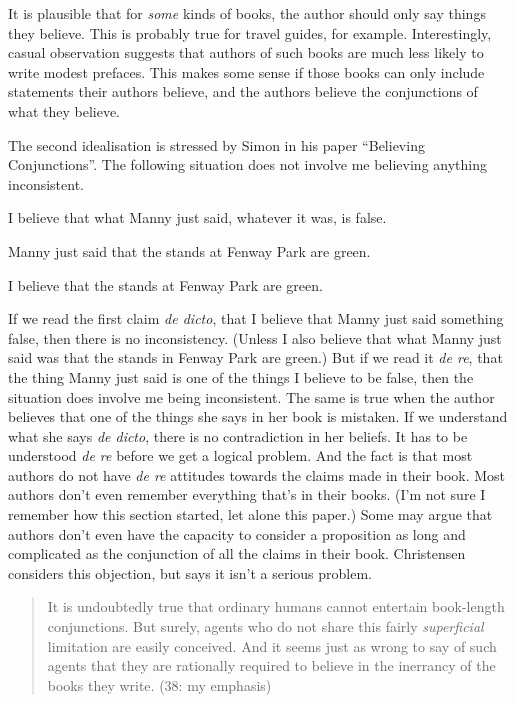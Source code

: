 It is plausible that for \textit{some} kinds of books, the author should only say things they believe. This is probably true for travel guides, for example. Interestingly, casual observation suggests that authors of such books are much less likely to write modest prefaces. This makes some sense if those books can only include statements their authors believe, and the authors believe the conjunctions of what they believe.

The second idealisation is stressed by Simon \citeauthor{Evnine1999} in his paper ``Believing Conjunctions''. The following situation does not involve me believing anything inconsistent. 

\begin{itemize*}
\item I believe that what Manny just said, whatever it was, is false. 
\item Manny just said that the stands at Fenway Park are green. 
\item I believe that the stands at Fenway Park are green. 
\end{itemize*}

\noindent If we read the first claim \textit{de dicto}, that I believe that Manny just said something false, then there is no inconsistency. (Unless I also believe that what Manny just said was that the stands in Fenway Park are green.) But if we read it \textit{de re}, that the thing Manny just said is one of the things I believe to be false, then the situation does involve me being inconsistent. The same is true when the author believes that one of the things she says in her book is mistaken. If we understand what she says \textit{de dicto}, there is no contradiction in her beliefs. It has to be understood \textit{de re} before we get a logical problem. And the fact is that most authors do not have \textit{de re} attitudes towards the claims made in their book. Most authors don't even remember everything that's in their books. (I'm not sure I remember how this section started, let alone this paper.) Some may argue that authors don't even have the capacity to consider a proposition as long and complicated as the conjunction of all the claims in their book. Christensen considers this objection, but says it isn't a serious problem.

\begin{quote}
It is undoubtedly true that ordinary humans cannot entertain book-length conjunctions. But surely, agents who do not share this fairly \textit{superficial} limitation are easily conceived. And it seems just as wrong to say of such agents that they are rationally required to believe in the inerrancy of the books they write. (38: my emphasis)
\end{quote}

